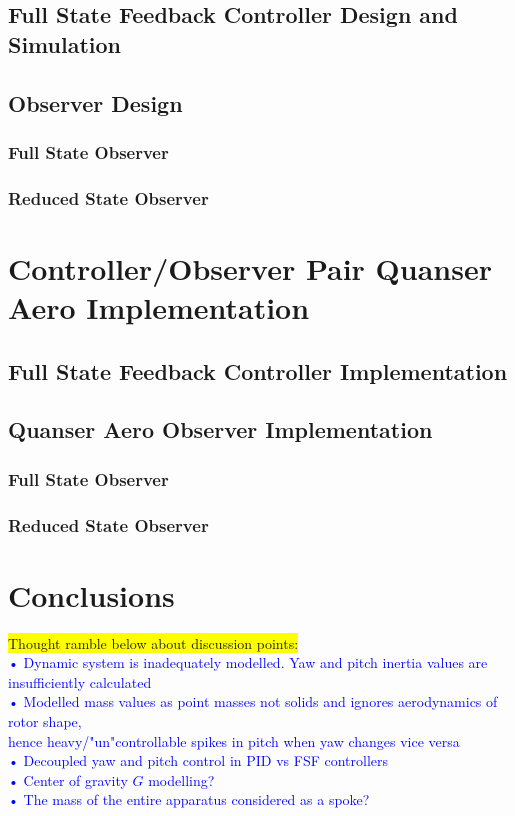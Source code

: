 \documentclass[11pt]{article}
\begin{document}
\subsection{Full State Feedback Controller Design and Simulation}

\subsection{Observer Design}

\subsubsection{Full State Observer}

\subsubsection{Reduced State Observer}

\section{Controller/Observer Pair Quanser Aero Implementation}
\subsection{Full State Feedback Controller Implementation}

\subsection{Quanser Aero Observer Implementation}

\subsubsection{Full State Observer}

\subsubsection{Reduced State Observer}

\section{Conclusions}
\colorbox{yellow}{Thought ramble below about discussion points:}\\
\textcolor{blue}{• Dynamic system is inadequately modelled. Yaw and pitch inertia values are insufficiently calculated\\
• Modelled mass values as point masses not solids and ignores aerodynamics of rotor shape, \\hence heavy/"un"controllable spikes in pitch when yaw changes vice versa\\
• Decoupled yaw and pitch control in PID vs FSF controllers\\
• Center of gravity $G$ modelling?\\
• The mass of the entire apparatus considered as a spoke?}\\
\end{document}
